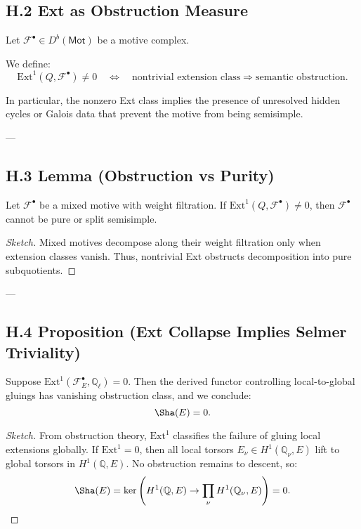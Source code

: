 \subsection*{H.2 Ext as Obstruction Measure}

Let \( \mathcal{F}^\bullet \in D^b(\mathsf{Mot}) \) be a motive complex.

\begin{definition}
We define:
\[
\mathrm{Ext}^1(Q, \mathcal{F}^\bullet) \neq 0 \quad \Leftrightarrow \quad 
\text{nontrivial extension class} \Rightarrow \text{semantic obstruction}.
\]
\end{definition}

In particular, the nonzero Ext class implies the presence of unresolved hidden cycles or Galois data  
that prevent the motive from being semisimple.

---

\subsection*{H.3 Lemma (Obstruction vs Purity)}

\begin{lemma}
Let \( \mathcal{F}^\bullet \) be a mixed motive with weight filtration.  
If \( \mathrm{Ext}^1(Q, \mathcal{F}^\bullet) \neq 0 \), then \( \mathcal{F}^\bullet \) cannot be pure or split semisimple.
\end{lemma}

\begin{proof}[Sketch]
Mixed motives decompose along their weight filtration only when extension classes vanish.  
Thus, nontrivial Ext obstructs decomposition into pure subquotients.
\end{proof}

---

\subsection*{H.4 Proposition (Ext Collapse Implies Selmer Triviality)}

\begin{proposition}
Suppose \( \mathrm{Ext}^1(\mathcal{F}_E^\bullet, \mathbb{Q}_\ell) = 0 \).  
Then the derived functor controlling local-to-global gluings has vanishing obstruction class, and we conclude:
\[
\Sha(E) = 0.
\]
\end{proposition}

\begin{proof}[Sketch]
From obstruction theory, \( \mathrm{Ext}^1 \) classifies the failure of gluing local extensions globally.  
If \( \mathrm{Ext}^1 = 0 \), then all local torsors \( E_\nu \in H^1(\mathbb{Q}_\nu, E) \) lift to global torsors in \( H^1(\mathbb{Q}, E) \).  
No obstruction remains to descent, so:
\[
\Sha(E) = \ker\left(H^1(\mathbb{Q}, E) \to \prod_\nu H^1(\mathbb{Q}_\nu, E)\right) = 0.
\]
\end{proof}


